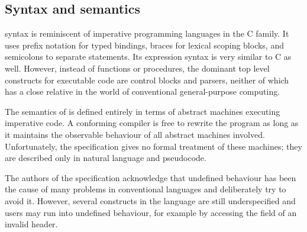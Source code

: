 
\subsection{Syntax and semantics}



\pfs syntax is reminiscent of imperative programming languages in the C family.
It uses prefix notation for typed bindings, braces for lexical scoping blocks,
and semicolons to separate statements. Its expression syntax is very similar to
C as well. However, instead of functions or procedures, the dominant top level
constructs for executable code are control blocks and parsers, neither of which
has a close relative in the world of conventional general-purpose computing.

The semantics of \pfs is defined entirely in terms of abstract machines
executing imperative code. A conforming compiler is free to rewrite the \pfs
program as long as it maintains the observable behaviour of all abstract
machines involved. Unfortunately, the specification gives no formal treatment
of these machines; they are described only in natural language and pseudocode.

The authors of the specification acknowledge that undefined behaviour has been
the cause of many problems in conventional languages and deliberately try to
avoid it. However, several constructs in the language are still underspecified
and users may run into undefined behaviour, for example by accessing the field
of an invalid header.

